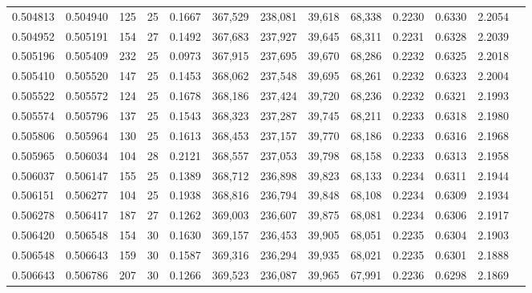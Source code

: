 \begin{tabular}{rrrrrrrrrrrrr}
0.504813 & 0.504940 &   125 &  25 &                                     0.1667 & 367,529 & 238,081 &  39,618 &  68,338 & 0.2230 & 0.6330 & 2.2054 \\
0.504952 & 0.505191 &   154 &  27 &                                     0.1492 & 367,683 & 237,927 &  39,645 &  68,311 & 0.2231 & 0.6328 & 2.2039 \\
0.505196 & 0.505409 &   232 &  25 &                                     0.0973 & 367,915 & 237,695 &  39,670 &  68,286 & 0.2232 & 0.6325 & 2.2018 \\
0.505410 & 0.505520 &   147 &  25 &                                     0.1453 & 368,062 & 237,548 &  39,695 &  68,261 & 0.2232 & 0.6323 & 2.2004 \\
0.505522 & 0.505572 &   124 &  25 &                                     0.1678 & 368,186 & 237,424 &  39,720 &  68,236 & 0.2232 & 0.6321 & 2.1993 \\
0.505574 & 0.505796 &   137 &  25 &                                     0.1543 & 368,323 & 237,287 &  39,745 &  68,211 & 0.2233 & 0.6318 & 2.1980 \\
0.505806 & 0.505964 &   130 &  25 &                                     0.1613 & 368,453 & 237,157 &  39,770 &  68,186 & 0.2233 & 0.6316 & 2.1968 \\
0.505965 & 0.506034 &   104 &  28 &                                     0.2121 & 368,557 & 237,053 &  39,798 &  68,158 & 0.2233 & 0.6313 & 2.1958 \\
0.506037 & 0.506147 &   155 &  25 &                                     0.1389 & 368,712 & 236,898 &  39,823 &  68,133 & 0.2234 & 0.6311 & 2.1944 \\
0.506151 & 0.506277 &   104 &  25 &                                     0.1938 & 368,816 & 236,794 &  39,848 &  68,108 & 0.2234 & 0.6309 & 2.1934 \\
0.506278 & 0.506417 &   187 &  27 &                                     0.1262 & 369,003 & 236,607 &  39,875 &  68,081 & 0.2234 & 0.6306 & 2.1917 \\
0.506420 & 0.506548 &   154 &  30 &                                     0.1630 & 369,157 & 236,453 &  39,905 &  68,051 & 0.2235 & 0.6304 & 2.1903 \\
0.506548 & 0.506643 &   159 &  30 &                                     0.1587 & 369,316 & 236,294 &  39,935 &  68,021 & 0.2235 & 0.6301 & 2.1888 \\
0.506643 & 0.506786 &   207 &  30 &                                     0.1266 & 369,523 & 236,087 &  39,965 &  67,991 & 0.2236 & 0.6298 & 2.1869 \\

\end{tabular}
